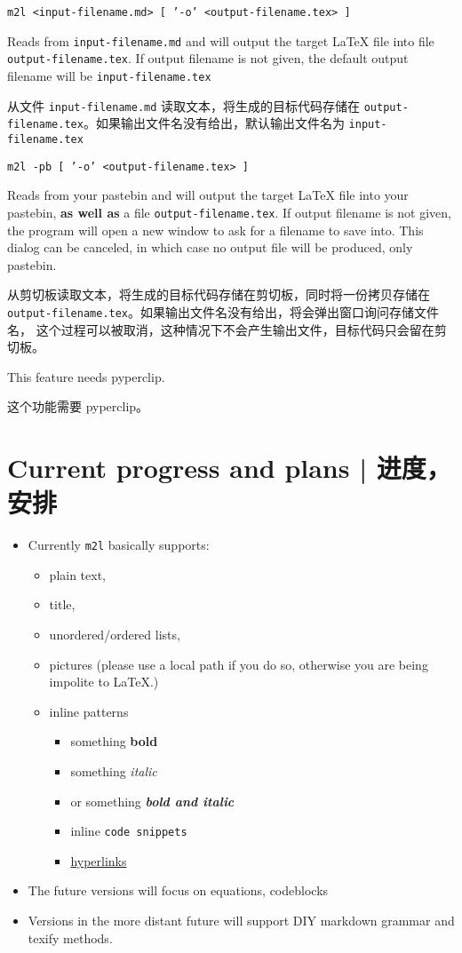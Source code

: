 \documentclass{ctexart}
\begin{document}
	\texttt{m2l <input-filename.md> [ '-o' <output-filename.tex> ]}

	Reads from \texttt{input-filename.md} and will output the target LaTeX file into file \texttt{output-filename.tex}. If output filename is not given, the default output filename will be \texttt{input-filename.tex}

	从文件 \texttt{input-filename.md} 读取文本，将生成的目标代码存储在 \texttt{output-filename.tex}。如果输出文件名没有给出，默认输出文件名为 \texttt{input-filename.tex}

	\texttt{m2l -pb [ '-o' <output-filename.tex> ]}

	Reads from your pastebin and will output the target LaTeX file into your pastebin, \textbf{as well as} a file \texttt{output-filename.tex}. If output filename is not given, the program will open a new window to ask for a filename to save into. This dialog can be canceled, in which case no output file will be produced, only pastebin.

	从剪切板读取文本，将生成的目标代码存储在剪切板，同时将一份拷贝存储在 \texttt{output-filename.tex}。如果输出文件名没有给出，将会弹出窗口询问存储文件名， 这个过程可以被取消，这种情况下不会产生输出文件，目标代码只会留在剪切板。

	This feature needs pyperclip.

	这个功能需要 pyperclip。

	\section{Current progress and plans | 进度，安排}

	\begin{itemize}
		\item Currently \texttt{m2l} basically supports:
		\begin{itemize}
			\item plain text,
			\item title,
			\item unordered/ordered lists,
			\item pictures (please use a local path if you do so, otherwise you are being impolite to LaTeX.)
			\item inline patterns
			\begin{itemize}
				\item something \textbf{bold}
				\item something \textit{italic}
				\item or something \textbf{\textit{bold and italic}}
				\item inline \texttt{code snippets}
				\item \href{https://http.cat/404}{hyperlinks}
			\end{itemize}
		\end{itemize}
		\item The future versions will focus on equations, codeblocks
		\item Versions in the more distant future will support DIY markdown grammar and texify methods.
	\end{itemize}
\end{document}
